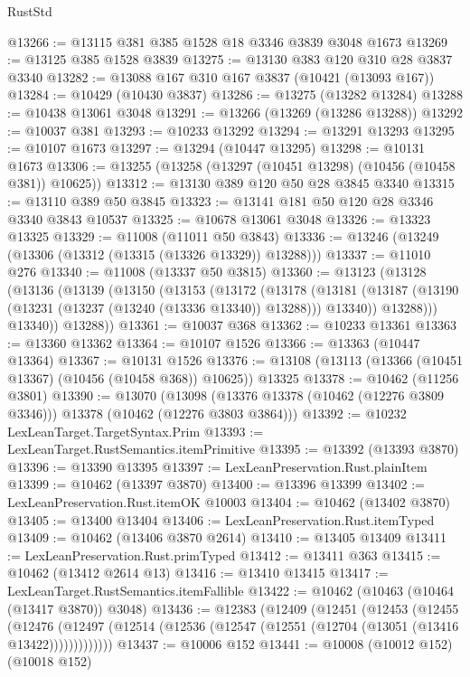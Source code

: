 \begin{lexlean}{RustStd}
\begin{coremodule}
@13266 := @13115 @381 @385 @1528 @18 @3346 @3839 @3048 @1673
@13269 := @13125 @385 @1528 @3839
@13275 := @13130 @383 @120 @310 @28 @3837 @3340
@13282 := @13088 @167 @310 @167 @3837 (@10421 (@13093 @167))
@13284 := @10429 (@10430 @3837)
@13286 := @13275 (@13282 @13284)
@13288 := @10438 @13061 @3048
@13291 := @13266 (@13269 (@13286 @13288))
@13292 := @10037 @381
@13293 := @10233 @13292
@13294 := @13291 @13293
@13295 := @10107 @1673
@13297 := @13294 (@10447 @13295)
@13298 := @10131 @1673
@13306 := @13255 (@13258 (@13297 (@10451 @13298) (@10456 (@10458 @381)) @10625))
@13312 := @13130 @389 @120 @50 @28 @3845 @3340
@13315 := @13110 @389 @50 @3845
@13323 := @13141 @181 @50 @120 @28 @3346 @3340 @3843 @10537
@13325 := @10678 @13061 @3048
@13326 := @13323 @13325
@13329 := @11008 (@11011 @50 @3843)
@13336 := @13246 (@13249 (@13306 (@13312 (@13315 (@13326 @13329)) @13288)))
@13337 := @11010 @276
@13340 := @11008 (@13337 @50 @3815)
@13360 := @13123
    (@13128
      (@13136
        (@13139
          (@13150
            (@13153
              (@13172
                (@13178
                  (@13181
                    (@13187 (@13190 (@13231 (@13237 (@13240 (@13336 @13340)) @13288))) @13340))
                  @13288)))
            @13340))
        @13288))
@13361 := @10037 @368
@13362 := @10233 @13361
@13363 := @13360 @13362
@13364 := @10107 @1526
@13366 := @13363 (@10447 @13364)
@13367 := @10131 @1526
@13376 := @13108 (@13113 (@13366 (@10451 @13367) (@10456 (@10458 @368)) @10625)) @13325
@13378 := @10462 (@11256 @3801)
@13390 := @13070
    (@13098 (@13376 @13378 (@10462 (@12276 @3809 @3346))) @13378 (@10462 (@12276 @3803 @3864)))
@13392 := @10232 LexLeanTarget.TargetSyntax.Prim
@13393 := LexLeanTarget.RustSemantics.itemPrimitive
@13395 := @13392 (@13393 @3870)
@13396 := @13390 @13395
@13397 := LexLeanPreservation.Rust.plainItem
@13399 := @10462 (@13397 @3870)
@13400 := @13396 @13399
@13402 := LexLeanPreservation.Rust.itemOK @10003
@13404 := @10462 (@13402 @3870)
@13405 := @13400 @13404
@13406 := LexLeanPreservation.Rust.itemTyped
@13409 := @10462 (@13406 @3870 @2614)
@13410 := @13405 @13409
@13411 := LexLeanPreservation.Rust.primTyped
@13412 := @13411 @363
@13415 := @10462 (@13412 @2614 @13)
@13416 := @13410 @13415
@13417 := LexLeanTarget.RustSemantics.itemFallible
@13422 := @10462 (@10463 (@10464 (@13417 @3870)) @3048)
@13436 := @12383
    (@12409
      (@12451
        (@12453
          (@12455
            (@12476
              (@12497 (@12514 (@12536 (@12547 (@12551 (@12704 (@13051 (@13416 @13422)))))))))))))
@13437 := @10006 @152
@13441 := @10008 (@10012 @152) (@10018 @152)

\end{coremodule}
\end{lexlean}
